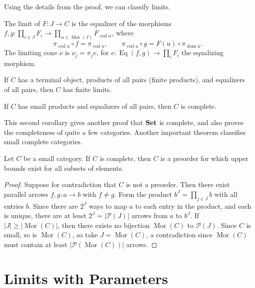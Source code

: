 Using the details from the proof, we can classify limits.

\begin{theorem}\label{thm:5.4}
	The limit of $F : J \to C$ is the equalizer of the morphisms $f,g : \prod_{i\in J} F_i \to \prod_{\alpha \in \operatorname{Mor} (J)} F_{\operatorname{cod} \alpha } $, where
	\[
		\pi_{\operatorname{cod} u}\circ  f=\pi_{\operatorname{cod} u} ,\qquad \pi_{\operatorname{cod} u} \circ g=F(u)\circ \pi _{\operatorname{dom} u} 
	.\]
	The limiting cone $\nu $ is $\nu _j=\pi _j e$, for $e : \operatorname{Eq} (f,g) \to \prod_{i} F_i$ the equalizing morphism.
\end{theorem}

\begin{corollary}\label{cor:5.1}
	If $C$ has a terminal object, products of all pairs (finite products), and equalizers of all pairs, then $C$ has finite limits.
\end{corollary}
\begin{corollary}\label{cor:5.2}
	If $C$ has small products and equalizers of all pairs, then $C$ is complete.
\end{corollary}

This second corollary gives another proof that $\mathbf{Set} $ is complete, and also proves the completeness of quite a few categories. Another important theorem classifies small complete categories.

\begin{proposition}[Freyd]\label{prp:5.1}
	Let $C$ be a small category. If $C$ is complete, then $C$ is a preorder for which upper bounds exist for all subsets of elements.
\end{proposition}
\begin{proof}
	Suppose for contradiction that $C$ is not a preorder. Then there exist parallel arrows $f,g : a \to b$ with $f\neq g$. Form the product $b^J=\prod_{j\in J} b$ with all entries $b$. Since there are $2^J$ ways to map $a$ to each entry in the product, and each is unique, there are at least $2^J=\left| \mathcal{P} (J) \right| $ arrows from $a$ to $b^J$. If $\left| J \right| \geq \left| \operatorname{Mor} (C) \right| $, then there exists no bijection $\operatorname{Mor} (C)$ to $\mathcal{P} (J)$. Since $C$ is small, so is $\operatorname{Mor} (C)$, so take $J=\operatorname{Mor} (C)$, a contradiction since $\operatorname{Mor} (C)$ must contain at least $\left| \mathcal{P} (\operatorname{Mor} (C)) \right| $ arrows.
\end{proof}

\section{Limits with Parameters}

